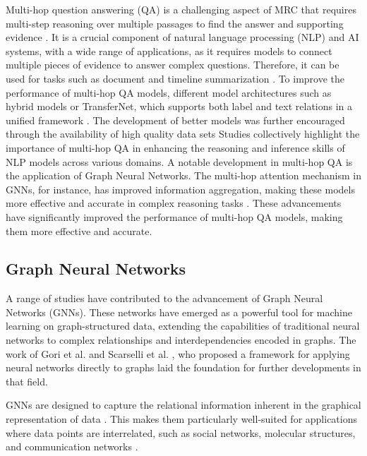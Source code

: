 \documentclass[sigplan,screen,nonacm]{acmart}
\begin{document}
Multi-hop question answering (QA) is a challenging aspect of MRC that requires multi-step reasoning over multiple passages to find the answer 
and supporting evidence \cite{RN165}. It is a crucial component of natural language processing (NLP) and AI systems, with a wide range of applications, 
as it requires models to connect multiple pieces of evidence to answer complex questions. Therefore, it can be used for tasks such as document 
and timeline summarization \cite{RN202} \cite{RN201}. To improve the performance of multi-hop QA models, different model architectures such 
as hybrid models or TransferNet, which supports both label and text relations in a unified framework \cite{RN164} \cite{RN133}. 
The development of better models was further encouraged through the availability of high quality data sets \cite{RN116} \cite{RN115}
Studies collectively highlight the importance of multi-hop QA in enhancing the reasoning and inference skills of NLP models across various domains. 
A notable development in multi-hop QA is the application of Graph Neural Networks. The multi-hop attention mechanism in GNNs, for instance, 
has improved information aggregation, making these models more effective and accurate in complex reasoning tasks \cite{RN109}. These advancements 
have significantly improved the performance of multi-hop QA models, making them more effective and accurate.

\subsection{Graph Neural Networks}

A range of studies have contributed to the advancement of Graph Neural Networks (GNNs). These networks have emerged 
as a powerful tool for machine learning on graph-structured data, extending the capabilities of traditional neural networks to complex relationships 
and interdependencies encoded in graphs. The work of Gori et al. \cite{RN203} and Scarselli et al. \cite{RN204}, who proposed a framework for 
applying neural networks directly to graphs laid the foundation for further developments in that field.

GNNs are designed to capture the relational information inherent in the graphical representation of data \cite{RN205}. This makes them particularly 
well-suited for applications where data points are interrelated, such as social networks, molecular structures, and communication networks \cite{RN206}.
\end{document}
